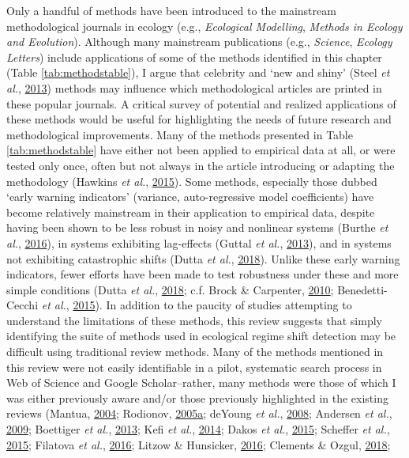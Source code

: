 \documentclass[12pt,twoside,openany]{reedthesis}
\begin{document}
Only a handful of methods have been introduced to the mainstream methodological journals in ecology (e.g., \emph{Ecological Modelling}, \emph{Methods in Ecology and Evolution}). Although many mainstream publications (e.g., \emph{Science}, \emph{Ecology Letters}) include applications of some of the methods identified in this chapter (Table \ref{tab:methodstable}), I argue that celebrity and `new and shiny' (Steel \emph{et al.}, \protect\hyperlink{ref-steel2013applied}{2013}) methods may influence which methodological articles are printed in these popular journals. A critical survey of potential and realized applications of these methods would be useful for highlighting the needs of future research and methodological improvements. Many of the methods presented in Table \ref{tab:methodstable} have either not been applied to empirical data at all, or were tested only once, often but not always in the article introducing or adapting the methodology (Hawkins \emph{et al.}, \protect\hyperlink{ref-hawkins2015ecosystems}{2015}). Some methods, especially those dubbed `early warning indicators' (variance, auto-regressive model coefficients) have become relatively mainstream in their application to empirical data, despite having been shown to be less robust in noisy and nonlinear systems (Burthe \emph{et al.}, \protect\hyperlink{ref-burthe2016early}{2016}), in systems exhibiting lag-effects (Guttal \emph{et al.}, \protect\hyperlink{ref-guttal2013robustness}{2013}), and in systems not exhibiting catastrophic shifts (Dutta \emph{et al.}, \protect\hyperlink{ref-dutta2018robustness}{2018}). Unlike these early warning indicators, fewer efforts have been made to test robustness under these and more simple conditions (Dutta \emph{et al.}, \protect\hyperlink{ref-dutta2018robustness}{2018}; c.f. Brock \& Carpenter, \protect\hyperlink{ref-brock2010interacting}{2010}; Benedetti-Cecchi \emph{et al.}, \protect\hyperlink{ref-benedetti2015experimental}{2015}). In addition to the paucity of studies attempting to understand the limitations of these methods, this review suggests that simply identifying the suite of methods used in ecological regime shift detection may be difficult using traditional review methods. Many of the methods mentioned in this review were not easily identifiable in a pilot, systematic search process in Web of Science and Google Scholar--rather, many methods were those of which I was either previously aware and/or those previously highlighted in the existing reviews (Mantua, \protect\hyperlink{ref-mantua_methods_2004}{2004}; Rodionov, \protect\hyperlink{ref-rodionov_brief_2005}{2005}\protect\hyperlink{ref-rodionov_brief_2005}{a}; deYoung \emph{et al.}, \protect\hyperlink{ref-deyoung_regime_2008}{2008}; Andersen \emph{et al.}, \protect\hyperlink{ref-andersen_ecological_2009}{2009}; Boettiger \emph{et al.}, \protect\hyperlink{ref-boettiger_early_2013}{2013}; Kefi \emph{et al.}, \protect\hyperlink{ref-kefi2014early}{2014}; Dakos \emph{et al.}, \protect\hyperlink{ref-dakos2015resilience}{2015}; Scheffer \emph{et al.}, \protect\hyperlink{ref-scheffer2015generic}{2015}; Filatova \emph{et al.}, \protect\hyperlink{ref-filatova2016regime}{2016}; Litzow \& Hunsicker, \protect\hyperlink{ref-litzow_early_2016}{2016}; Clements \& Ozgul, \protect\hyperlink{ref-clements2018indicators}{2018}; 
\end{document}
